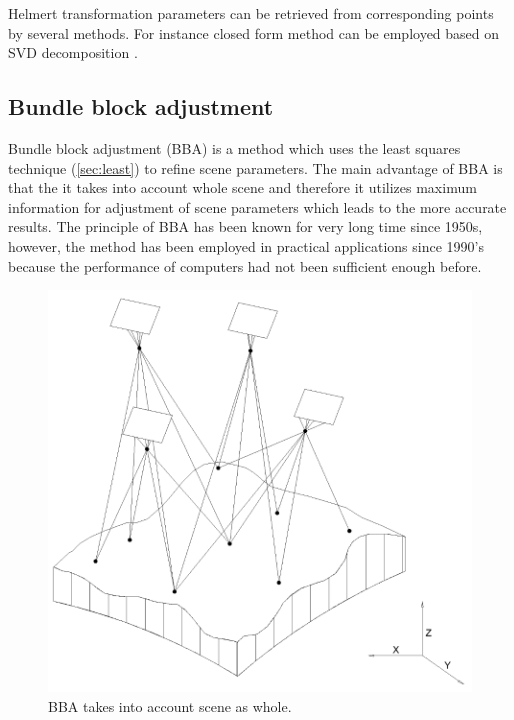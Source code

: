 \documentclass[a4paper,12pt]{article}
\begin{document}

Helmert transformation parameters can be retrieved from corresponding points by several methods.  
For instance closed form method can be employed based on SVD decomposition
\cite{sjoberg2013closed}.

\subsection{Bundle block adjustment}

Bundle block adjustment (BBA) is a method which uses the least squares technique (\ref{sec:least}) to refine scene parameters. 
The main advantage of BBA is that the it takes into account whole scene and therefore it utilizes 
maximum information for adjustment of scene parameters which leads to the more accurate results.
The principle of BBA has been known for very long time since 1950s,
however, the method has been employed in practical applications since 1990's because the performance of computers had not been 
sufficient enough before. 


\begin{figure}[h]
    \centering
    \includegraphics[scale=0.3]{figures/bba.png}
    \caption{BBA takes into account scene as whole.}
    \label{fig:bba}
\end{figure}
\end{document}
